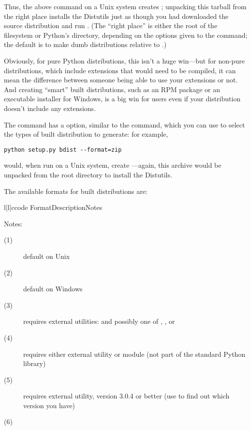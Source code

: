 \documentclass{howto}
\begin{document}
Thus, the above command on a Unix system creates
; unpacking this tarball
from the right place installs the Distutils just as though you had
downloaded the source distribution and run .  (The ``right place'' is either the root of the filesystem or 
Python's  directory, depending on the options given to
the  command; the default is to make dumb
distributions relative to .)  

Obviously, for pure Python distributions, this isn't a huge win---but
for non-pure distributions, which include extensions that would need to
be compiled, it can mean the difference between someone being able to
use your extensions or not.  And creating ``smart'' built distributions,
such as an RPM package or an executable installer for Windows, is a big
win for users even if your distribution doesn't include any extensions.

The  command has a  option,
similar to the  command, which you can use to select the
types of built distribution to generate: for example,
\begin{verbatim}
python setup.py bdist --format=zip
\end{verbatim}
would, when run on a Unix system, create
---again, this archive would be
unpacked from the root directory to install the Distutils.

The available formats for built distributions are:
\begin{tableiii}{l|l|c}{code}%
  {Format}{Description}{Notes}
\end{tableiii}

\noindent Notes:
\begin{description}
\item[(1)] default on Unix
\item[(2)] default on Windows 
\item[(3)] requires external utilities:  and possibly one
  of , , or 
\item[(4)] requires either external  utility or
   module (not part of the standard Python library)
\item[(5)] requires external  utility, version 3.0.4 or
  better (use  to find out which version you have)
\item[(6)] 
\end{description}
\end{document}
